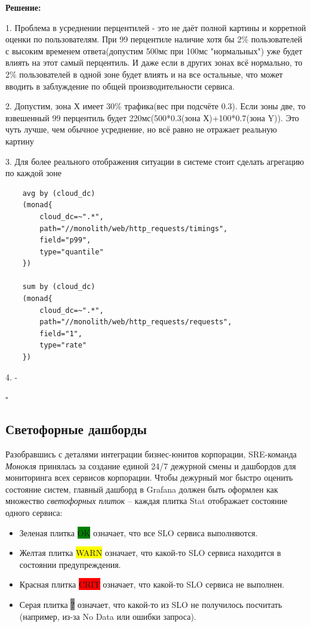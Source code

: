 \documentclass[12pt]{article}
\newenvironment{solution}
{
  \par\textbf{Решение:}\par\bigbreak
  \begingroup
}
{
  \par\bigbreak\hfill$\square$%
  \par\endgroup
}
\begin{document}
\begin{solution}
	1. Проблема в усреднении перцентилей - это не даёт полной картины и корретной оценки по пользователям. При 99 перцентиле наличие хотя бы 2\% пользователей с высоким временем ответа(допустим 500мс при 100мс "нормальных") уже будет влиять на этот самый перцентиль. И даже если в других зонах всё нормально, то 2\% пользователей в одной зоне будет влиять и на все остальные, что может вводить в заблуждение по общей производительности сервиса.
    
    2. Допустим, зона Х имеет 30\% трафика(вес при подсчёте 0.3). Если зоны две, то взвешенный 99 перцентиль будет 220мс(500*0.3(зона Х)+100*0.7(зона Y)). Это чуть лучше, чем обычное усреднение, но всё равно не отражает реальную картину
	
    3. Для более реального отображения ситуации в системе стоит сделать агрегацию по каждой зоне
	\begin{verbatim}
	avg by (cloud_dc) 
    (monad{
		cloud_dc=~".*",
		path="//monolith/web/http_requests/timings",
		field="p99",
		type="quantile"
	})

	sum by (cloud_dc) 
    (monad{
		cloud_dc=~".*",
		path="//monolith/web/http_requests/requests",
		field="1",
		type="rate"
	})
	\end{verbatim}

	4. -
\end{solution}

\break
\subsection{Светофорные дашборды}

Разобравшись с деталями интеграции бизнес-юнитов корпорации, SRE-команда \textit{Монокля}
принялась за создание единой 24/7 дежурной смены и дашбордов для мониторинга всех сервисов корпорации.
Чтобы дежурный мог быстро оценить состояние систем, главный дашборд в Grafana должен быть оформлен
как множество \textit{светофорных плиток} – каждая плитка Stat отображает состояние одного сервиса:

\begin{itemize}
	\item Зеленая плитка \colorbox{green}{OK} означает, что все SLO сервиса выполняются.
	\item Желтая плитка \colorbox{yellow}{WARN} означает, что какой-то SLO сервиса находится в состоянии предупреждения.
	\item Красная плитка \colorbox{red}{CRIT} означает, что какой-то SLO сервиса не выполнен.
	\item Серая плитка \colorbox{gray}{?} означает, что какой-то из SLO не получилось посчитать (например, из-за No Data или ошибки запроса).
\end{itemize}
\end{document}
